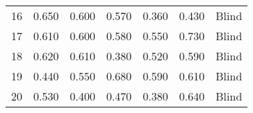 \begin{table}[!htb]
\begin{tabular}{lrrrrrl}
16   & 0.650 &  0.600 &        0.570 &         0.360 &    0.430 &             Blind \\
17   & 0.610 &  0.600 &        0.580 &         0.550 &    0.730 &             Blind \\
18   & 0.620 &  0.610 &        0.380 &         0.520 &    0.590 &             Blind \\
19   & 0.440 &  0.550 &        0.680 &         0.590 &    0.610 &             Blind \\
20   & 0.530 &  0.400 &        0.470 &         0.380 &    0.640 &             Blind \\
\bottomrule
\end{tabular}
\end{table}

